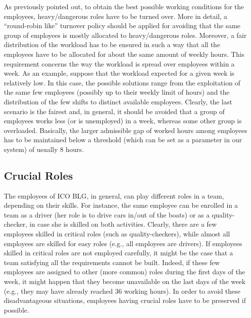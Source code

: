 \documentclass{tlp}
\begin{document}
As previously pointed out, to obtain the best possible working conditions
for the employees, heavy/dangerous roles have to be turned over.
More in detail, a ``round-robin like'' turnover policy should be applied for avoiding that the same group of employees is mostly allocated to heavy/dangerous roles.
Moreover,
a fair distribution of the workload has to be ensured in such a way that
all the employees have to be allocated for about the same amount of weekly hours.
This requirement concerns the way the workload is spread over employees within a week.
As an example, suppose that the workload expected for a given week is relatively low.
In this case, the possible solutions range from the exploitation of the same few employees
(possibly up to their weekly limit of hours) and the distribution of the few shifts to
distinct available employees. Clearly, the last scenario is the fairest and, in general,
it should be avoided that a group of employees works less (or is unemployed) in a week,
whereas some other group is overloaded. Basically, the larger admissible gap
of worked hours among employees has to be maintained below a threshold
(which can be set as a parameter in our system) of usually 8 hours.

\subsection{Crucial Roles}

The employees of ICO BLG, in general, can play different roles in a team,
depending on their skills. For instance, the same employee can be enrolled in a team
as a driver (her role is to drive cars in/out of the boats) or as a quality-checker,
in case she is skilled on both activities.
Clearly, there are a few employees skilled in critical roles
(such as quality-checkers),
while almost all employees are skilled for easy roles (e.g., all employees are drivers).
If employees skilled in critical roles are not employed carefully, it might be the case that
a team satisfying all the requirements cannot be built.
Indeed, if these few employees are assigned to other (more common) roles
during the first days of the week, it might happen that they become unavailable on the last days of the week
(e.g., they may have already reached 36 working hours). 
In order to avoid these disadvantageous situations, employees having crucial roles have to be preserved if possible.
\end{document}
